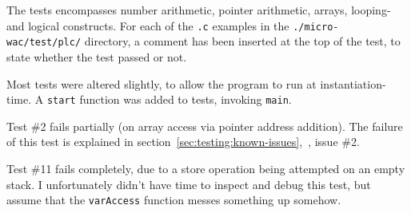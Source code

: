 \documentclass[a4paper]{article}
\begin{document}
The tests encompasses number arithmetic, pointer arithmetic, arrays, looping- and logical constructs. For each of the \texttt{.c} examples in the \texttt{./micro-wac/test/plc/} directory, a comment has been inserted at the top of the test, to state whether the test passed or not.

Most tests were altered slightly, to allow the program to run at instantiation-time. A \texttt{start} function was added to tests, invoking \texttt{main}.

Test \#2 fails partially (on array access via pointer address addition). The failure of this test is explained in section~\ref{sec:testing:known-issues},~, issue \#2.

Test \#11 fails completely, due to a store operation being attempted on an empty stack. I unfortunately didn't have time to inspect and debug this test, but assume that the \texttt{varAccess} function messes something up somehow.
\end{document}
